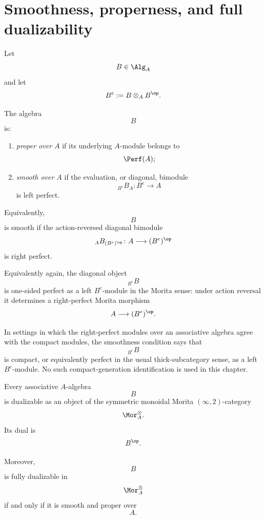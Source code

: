 \section{Smoothness, properness, and full dualizability}
\label{sec:smooth-proper-full-dualizable}

\begin{definition}
\label{def:smooth-proper-algebra}
Let
\[
    B
    \in
    \Alg_A
\]
and let
\[
    B^e
    :=
    B\otimes_A B^{\op}.
\]

The algebra
\[
    B
\]
is:
\begin{enumerate}[label=(\roman*)]
    \item \emph{proper over $A$} if its underlying $A$-module belongs to
    \[
        \Perf(A);
    \]

    \item \emph{smooth over $A$} if the evaluation, or diagonal,
    bimodule
    \[
        {}_{B^e}B_A
        \colon
        B^e
        \longrightarrow
        A
    \]
    is left perfect.
\end{enumerate}

Equivalently,
\[
    B
\]
is smooth if the action-reversed diagonal bimodule
\[
    {}_A B_{(B^e)^{\op}}
    \colon
    A
    \longrightarrow
    (B^e)^{\op}
\]
is right perfect.

Equivalently again, the diagonal object
\[
    {}_{B^e}B
\]
is one-sided perfect as a left $B^e$-module in the Morita sense: under
action reversal it determines a right-perfect Morita morphism
\[
    A
    \longrightarrow
    (B^e)^{\op}.
\]
\end{definition}

\begin{remark}
\label{rem:smoothness-compact-module-terminology}
In settings in which the right-perfect modules over an associative
algebra agree with the compact modules, the smoothness condition says
that
\[
    {}_{B^e}B
\]
is compact, or equivalently perfect in the usual thick-subcategory
sense, as a left $B^e$-module. No such compact-generation identification
is used in this chapter.
\end{remark}

\begin{theorem}
\label{thm:smooth-proper-fully-dualizable}
Every associative $A$-algebra
\[
    B
\]
is dualizable as an object of the symmetric monoidal Morita
$(\infty,2)$-category
\[
    \Mor_A^\otimes.
\]
Its dual is
\[
    B^{\op}.
\]

Moreover,
\[
    B
\]
is fully dualizable in
\[
    \Mor_A^\otimes
\]
if and only if it is smooth and proper over
\[
    A.
\]
\end{theorem}


